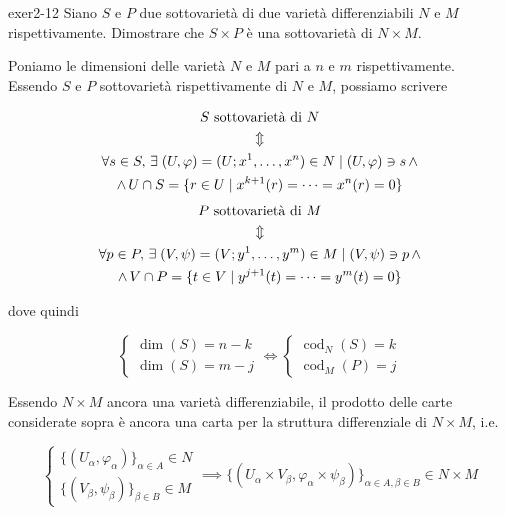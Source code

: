 {exer2-12}
{
Siano $ S $ e $ P $ due sottovarietà di due varietà differenziabili $ N $ e $ M $ rispettivamente. Dimostrare che $ S \times P $ è una sottovarietà di $ N \times M $.
}
{
Poniamo le dimensioni delle varietà $ N $ e $ M $ pari a $ n $ e $ m $ rispettivamente. \\
Essendo $ S $ e $ P $ sottovarietà rispettivamente di $ N $ e $ M $, possiamo scrivere

\begin{gather}
	S \text{ sottovarietà di } N \nonumber \\
	\Updownarrow \\
	\forall s \in S, \, \exists \; (U,\varphi) = (U; x^{1},\dots,x^{n}) \in N \mid (U,\varphi) \ni s \, \wedge \nonumber \\
	\wedge \, U \cap S = \{ r \in U \mid x^{k+1}(r) = \dots = x^{n}(r) = 0 \} \nonumber
\end{gather}
%
\begin{gather}
	P \text{ sottovarietà di } M \nonumber \\
	\Updownarrow \\
	\forall p \in P, \, \exists \; (V,\psi) = (V; y^{1},\dots,y^{m}) \in M \mid (V,\psi) \ni p \, \wedge \nonumber \\
	\wedge \, V \cap P = \{ t \in V \mid y^{j+1}(t) = \dots = y^{m}(t) = 0 \} \nonumber
\end{gather}

dove quindi

\begin{equation}
	\begin{cases}
		\dim(S) = n - k \\
		\dim(S) = m - j
	\end{cases} %
	\iff %
	\begin{cases}
		\operatorname{cod}_{N}(S) = k \\
		\operatorname{cod}_{M}(P) = j
	\end{cases}
\end{equation}

Essendo $ N \times M $ ancora una varietà differenziabile, il prodotto delle carte considerate sopra è ancora una carta per la struttura differenziale di $ N \times M $, i.e.

\begin{equation}
	\begin{cases}
		\{(U_{\alpha},\varphi_{\alpha})\}_{\alpha \in A} \in N \\
		\{(V_{\beta},\psi_{\beta})\}_{\beta \in B} \in M
	\end{cases} %
	\implies %
	\{(U_{\alpha} \times V_{\beta}, \varphi_{\alpha} \times \psi_{\beta})\}_{\alpha \in A, \beta \in B} \in N \times M
\end{equation}

}
